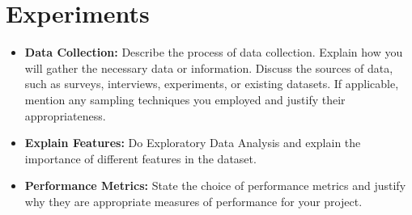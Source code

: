 \documentclass[conference]{IEEEtran}
\begin{document}
\section{Experiments}
\begin{itemize}
	\item \textbf{Data Collection:} Describe the process of data collection. Explain how you will gather the necessary data or information. Discuss the sources of data, such as surveys, interviews, experiments, or existing datasets. If applicable, mention any sampling techniques you employed and justify their appropriateness.
	\item \textbf{Explain Features:} Do Exploratory Data Analysis and explain the importance of different features in the dataset. 
	\item \textbf{Performance Metrics:} State the choice of performance metrics and justify why they are appropriate measures of performance for your project.
\end{itemize}
\end{document}
